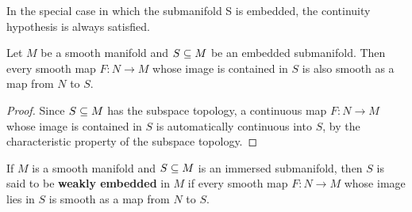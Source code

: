 In the special case in which the submanifold S is embedded, the continuity hypothesis is always satisfied.
\begin{corollary}\label{resrtict codomain to embedd}
Let $M$ be a smooth manifold and $S\subseteq M$ be an embedded submanifold. Then every smooth map $F:N\to M$ whose image is contained in $S$ is also smooth as a map from $N$ to $S$.
\end{corollary}
\begin{proof}
Since $S\subseteq M$ has the subspace topology, a continuous map $F:N\to M$ whose image is contained in $S$ is automatically continuous into $S$, by the characteristic
property of the subspace topology.
\end{proof}
If $M$ is a smooth manifold and $S\subseteq M$ is an immersed submanifold, then $S$ is said to be \textbf{weakly embedded} in $M$ if every smooth map $F:N\to M$ whose image lies in $S$ is smooth as a map from $N$ to $S$.
